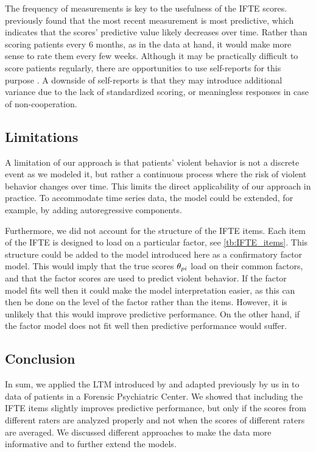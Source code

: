 \documentclass[a4paper,11pt]{article}
\begin{document}
The frequency of measurements is key to the usefulness of the IFTE scores.
\textcite{schuringa2019inpatient} previously found that the most recent measurement is most predictive, which indicates that the scores' predictive value likely decreases over time.
Rather than scoring patients every 6 months, as in the data at hand, it would make more sense to rate them every few weeks.
Although it may be practically difficult to score patients regularly, there are opportunities to use self-reports for this purpose \parencite{tuente2021mapping, bousardt2016predicting}.
A downside of self-reports is that they may introduce additional variance due to the lack of standardized scoring, or meaningless responses in case of non-cooperation.

\subsection{Limitations}
A limitation of our approach is that patients' violent behavior is not a discrete event as we modeled it, but rather a continuous process where the risk of violent behavior changes over time.
This limits the direct applicability of our approach in practice.
To accommodate time series data, the model could be extended, for example, by adding autoregressive components.

Furthermore, we did not account for the structure of the IFTE items.
Each item of the IFTE is designed to load on a particular factor, see \autoref{tb:IFTE_items}.
This structure could be added to the model introduced here as a confirmatory factor model.
This would imply that the true scores $\theta_{pi}$ load on their common factors, and that the factor scores are used to predict violent behavior.
If the factor model fits well then it could make the model interpretation easier, as this can then be done on the level of the factor rather than the items.
However, it is unlikely that this would improve predictive performance.
On the other hand, if the factor model does not fit well then predictive performance would suffer.

\subsection{Conclusion}
In sum, we applied the LTM introduced by \textcite{Anders2015cultural} and adapted previously by us in \textcite{vandenBergh2020cultural} to data of patients in a Forensic Psychiatric Center.
We showed that including the IFTE items slightly improves predictive performance, but only if the scores from different raters are analyzed properly and not when the scores of different raters are averaged.
We discussed different approaches to make the data more informative and to further extend the models.
\end{document}
